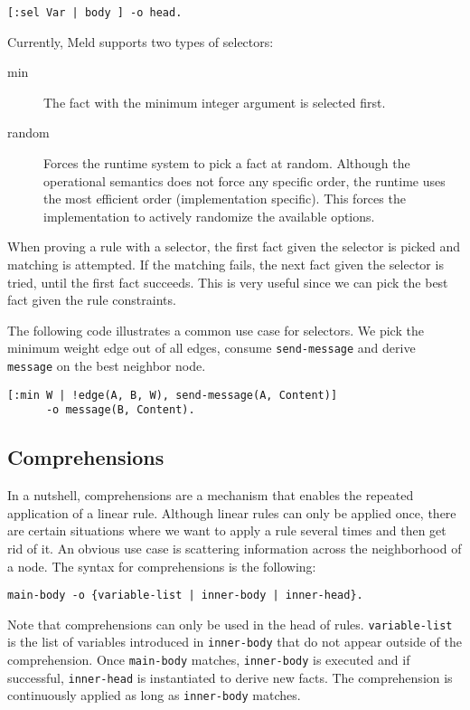 \documentclass[11pt]{article}
\begin{document}
\begin{verbatim}
[:sel Var | body ] -o head.
\end{verbatim}

Currently, Meld supports two types of selectors:

\begin{description}
\item[min] The fact with the minimum integer argument is selected first.
\item[random] Forces the runtime system to pick a fact at random. Although the operational semantics does not force any specific order, the runtime uses the most efficient order (implementation specific). This forces the implementation to actively randomize the available options.
\end{description}

When proving a rule with a selector, the first fact given the selector is picked and matching is attempted. If the matching fails, the next fact given the selector is tried, until the first fact succeeds. This is very useful since we can pick the best fact given the rule constraints.

The following code illustrates a common use case for selectors. We pick the minimum weight edge out of all edges, consume \texttt{send-message} and derive \texttt{message} on the best neighbor node.

\begin{verbatim}
[:min W | !edge(A, B, W), send-message(A, Content)]
      -o message(B, Content).
\end{verbatim}

\subsection{Comprehensions}

In a nutshell, comprehensions are a mechanism that enables the repeated application of a linear rule. Although linear rules can only be applied once, there are certain situations where we want to apply a rule several times and then get rid of it. An obvious use case is scattering information across the neighborhood of a node. The syntax for comprehensions is the following:

\begin{verbatim}
main-body -o {variable-list | inner-body | inner-head}.
\end{verbatim}

Note that comprehensions can only be used in the head of rules. \texttt{variable-list} is the list of variables introduced in \texttt{inner-body} that do not appear outside of the comprehension. Once \texttt{main-body} matches, \texttt{inner-body} is executed and if successful, \texttt{inner-head} is instantiated to derive new facts. The comprehension is continuously applied as long as \texttt{inner-body} matches.
\end{document}
